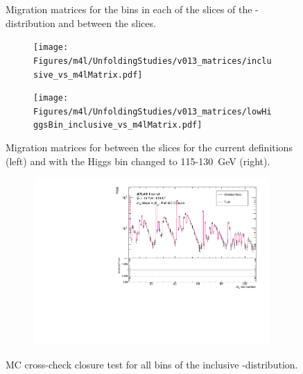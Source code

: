 \begin{figure}[htb]
\caption{Migration matrices for the \dPhill bins in each of the \mFourL slices of the \dPhill-\mFourL distribution and between the slices.\label{fig:dphimat}}
 \end{figure}


\FloatBarrier

\begin{figure}[htb]
  \begin{subfigure}{.49\textwidth}\centering\texttt{[image: Figures/m4l/UnfoldingStudies/v013\_matrices/inclusive\_vs\_m4lMatrix.pdf]}\end{subfigure}
  \begin{subfigure}{.49\textwidth}\centering\texttt{[image: Figures/m4l/UnfoldingStudies/v013\_matrices/lowHiggsBin\_inclusive\_vs\_m4lMatrix.pdf]}\end{subfigure}
  \caption{Migration matrices for between the \mFourL slices for the current definitions (left) and with the Higgs bin changed to 115-130~GeV (right).\label{fig:newHmig}}
\end{figure}

\FloatBarrier
\begin{figure}[htb]
  \centering
  \begin{subfigure}{.65\textwidth}\centering\includegraphics[width = 0.99\textwidth]{Figures/m4l/UnfoldingStudies/v014_closure/FullMCClosure_m4l_pt4l.pdf}\end{subfigure}
\caption{MC cross-check closure test for all bins of the inclusive \mFourL-\ptFourL distribution.\label{fig:pt4lclos}}
 \end{figure}

